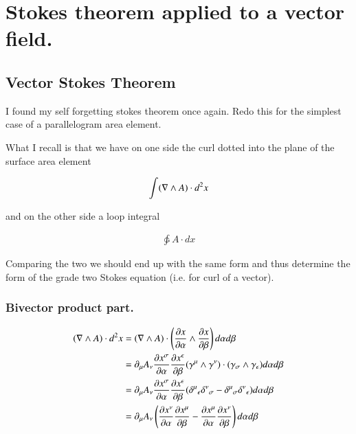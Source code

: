 

\usepackage{txfonts}

\chapter{Stokes theorem applied to a vector field.}
\label{chap:stokesGradeTwo}
\date{July 17, 2009}

\beginArtWithToc

\section{Vector Stokes Theorem}

I found my self forgetting stokes theorem once again.  Redo this for the simplest case of a parallelogram area element.

What I recall is that we have on one side the curl dotted into the plane of the surface area element

\begin{align}
\int ( \nabla \wedge A ) \cdot d^2 x
\end{align}

and on the other side a loop integral

\begin{align}
\ointctrclockwise A \cdot dx
\end{align}

Comparing the two we should end up with the same form and thus determine the form of the grade two Stokes equation (i.e. for curl of a vector).

\subsection{Bivector product part.}

\begin{align*}
( \nabla \wedge A ) \cdot d^2 x 
&=
( \nabla \wedge A ) \cdot \left(\frac{\partial {x}}{\partial {\alpha}} \wedge \frac{\partial {x}}{\partial {\beta}}\right) 
d\alpha d\beta \\
&=
\partial_\mu A_\nu \frac{\partial {x^\sigma}}{\partial {\alpha}} \frac{\partial {x^\epsilon}}{\partial {\beta}} (\gamma^\mu \wedge \gamma^\nu) \cdot (\gamma_\sigma \wedge \gamma_\epsilon) 
d\alpha d\beta \\
&=
\partial_\mu A_\nu \frac{\partial {x^\sigma}}{\partial {\alpha}} \frac{\partial {x^\epsilon}}{\partial {\beta}} ( {\delta^\mu}_\epsilon {\delta^\nu}_\sigma - {\delta^\mu}_\sigma {\delta^\nu}_\epsilon ) 
d\alpha d\beta \\
&=
\partial_\mu A_\nu \left( \frac{\partial {x^\nu}}{\partial {\alpha}} \frac{\partial {x^\mu}}{\partial {\beta}} - \frac{\partial {x^\mu}}{\partial {\alpha}} \frac{\partial {x^\nu}}{\partial {\beta}} \right) 
d\alpha d\beta \\
\end{align*}


